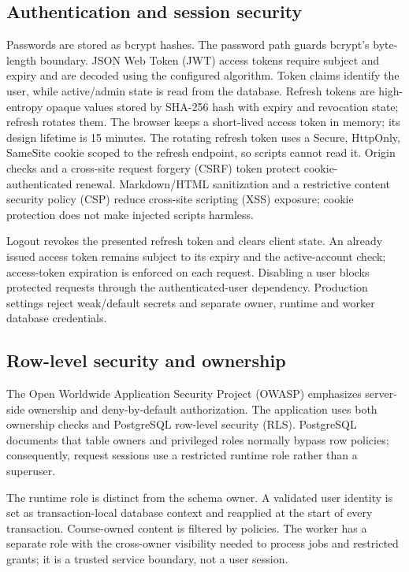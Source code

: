 \subsection{Authentication and session security}
Passwords are stored as bcrypt hashes\citep{bcrypt}. The password path guards bcrypt's byte-length boundary. JSON Web Token (JWT) access tokens\citep{jwt} require subject and expiry and are decoded using the configured algorithm. Token claims identify the user, while active/admin state is read from the database. Refresh tokens are high-entropy opaque values stored by SHA-256 hash with expiry and revocation state; refresh rotates them. The browser keeps a short-lived access token in memory; its design lifetime is 15 minutes. The rotating refresh token uses a Secure, HttpOnly, SameSite cookie scoped to the refresh endpoint, so scripts cannot read it. Origin checks and a cross-site request forgery (CSRF) token protect cookie-authenticated renewal. Markdown/HTML sanitization and a restrictive content security policy (CSP) reduce cross-site scripting (XSS) exposure; cookie protection does not make injected scripts harmless.

Logout revokes the presented refresh token and clears client state. An already issued access token remains subject to its expiry and the active-account check; access-token expiration is enforced on each request. Disabling a user blocks protected requests through the authenticated-user dependency. Production settings reject weak/default secrets and separate owner, runtime and worker database credentials.
\subsection{Row-level security and ownership}
The Open Worldwide Application Security Project (OWASP) emphasizes server-side ownership and deny-by-default authorization\citep{owaspaccess}. The application uses both ownership checks and PostgreSQL row-level security (RLS). PostgreSQL documents that table owners and privileged roles normally bypass row policies\citep{postgresrls}; consequently, request sessions use a restricted runtime role rather than a superuser.

The runtime role is distinct from the schema owner. A validated user identity is set as transaction-local database context and reapplied at the start of every transaction. Course-owned content is filtered by policies. The worker has a separate role with the cross-owner visibility needed to process jobs and restricted grants; it is a trusted service boundary, not a user session.

